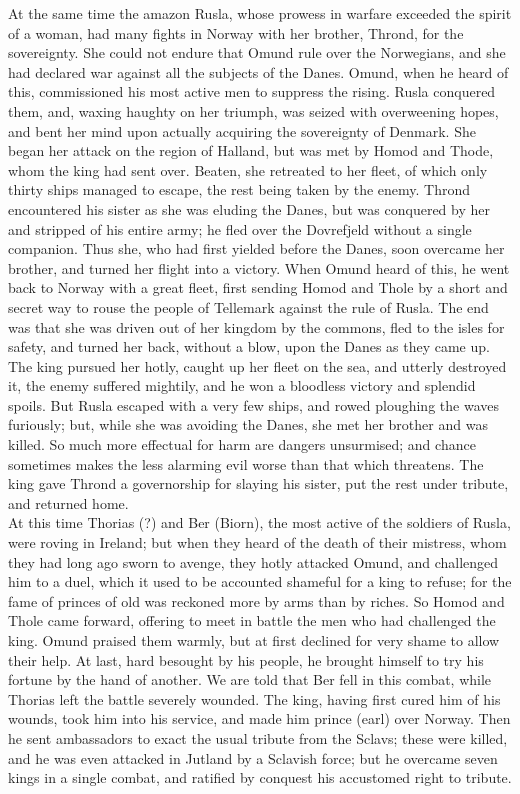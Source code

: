 \documentclass[10pt,a4paper]{report}
\begin{document}
At the same time the amazon Rusla, whose prowess in warfare exceeded the spirit of a woman, had many fights in Norway with her brother, Thrond, for the sovereignty. She could not endure that Omund rule over the Norwegians, and she had declared war against all the subjects of the Danes. Omund, when he heard of this, commissioned his most active men to suppress the rising. Rusla conquered them, and, waxing haughty on her triumph, was seized with overweening hopes, and bent her mind upon actually acquiring the sovereignty of Denmark. She began her attack on the region of Halland, but was met by Homod and Thode, whom the king had sent over. Beaten, she retreated to her fleet, of which only thirty ships managed to escape, the rest being taken by the enemy. Thrond encountered his sister as she was eluding the Danes, but was conquered by her and stripped of his entire army; he fled over the Dovrefjeld without a single companion. Thus she, who had first yielded before the Danes, soon overcame her brother, and turned her flight into a victory. When Omund heard of this, he went back to Norway with a great fleet, first sending Homod and Thole by a short and secret way to rouse the people of Tellemark against the rule of Rusla. The end was that she was driven out of her kingdom by the commons, fled to the isles for safety, and turned her back, without a blow, upon the Danes as they came up. The king pursued her hotly, caught up her fleet on the sea, and utterly destroyed it, the enemy suffered mightily, and he won a bloodless victory and splendid spoils. But Rusla escaped with a very few ships, and rowed ploughing the waves furiously; but, while she was avoiding the Danes, she met her brother and was killed. So much more effectual for harm are dangers unsurmised; and chance sometimes makes the less alarming evil worse than that which threatens. The king gave Thrond a governorship for slaying his sister, put the rest under tribute, and returned home.\\

At this time Thorias (?) and Ber (Biorn), the most active of the soldiers of Rusla, were roving in Ireland; but when they heard of the death of their mistress, whom they had long ago sworn to avenge, they hotly attacked Omund, and challenged him to a duel, which it used to be accounted shameful for a king to refuse; for the fame of princes of old was reckoned more by arms than by riches. So Homod and Thole came forward, offering to meet in battle the men who had challenged the king. Omund praised them warmly, but at first declined for very shame to allow their help. At last, hard besought by his people, he brought himself to try his fortune by the hand of another. We are told that Ber fell in this combat, while Thorias left the battle severely wounded. The king, having first cured him of his wounds, took him into his service, and made him prince (earl) over Norway. Then he sent ambassadors to exact the usual tribute from the Sclavs; these were killed, and he was even attacked in Jutland by a Sclavish force; but he overcame seven kings in a single combat, and ratified by conquest his accustomed right to tribute.\\
\end{document}
